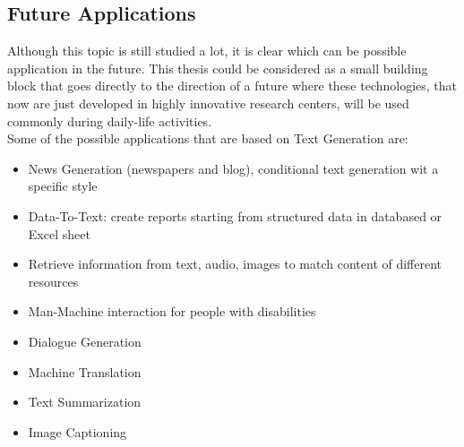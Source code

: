 \subsection{Future Applications}

Although this topic is still studied a lot, it is clear which can be possible application in the future. This thesis could be considered as a small building block that goes directly to the direction of a future where these technologies, that now are just developed in highly innovative research centers, will be used commonly during daily-life activities. \\
Some of the possible applications that are based on Text Generation are: 
\begin{itemize}
	\item News Generation (newspapers and blog), conditional text generation wit a specific style
	\item Data-To-Text: create reports starting from structured data in databased or Excel sheet
	\item Retrieve information from text, audio, images to match content of different resources
	\item Man-Machine interaction for people with disabilities
	\item Dialogue Generation
	\item Machine Translation
	\item Text Summarization
	\item Image Captioning
\end{itemize}